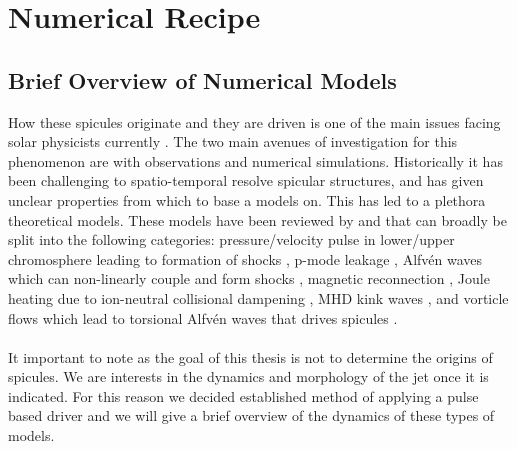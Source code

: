 \documentclass[12pt]{ociamthesis}
\newcommand{\Alfven}{Alfv\'{e}n }
\newcommand{\np}{\\ \\}
\begin{document}
\baselineskip=18pt


\chapter{Numerical Recipe}
\label{chap:Numerical_Recipe}
\section{Brief Overview of Numerical Models}
\label{sec:models}
How these spicules originate and they are driven is one of the main issues facing solar physicists currently \citep{Tsiropoula2012,kuzma2017ApJ84978K,Martinez-Sykora2017}. The two main avenues of investigation for this phenomenon are with observations and numerical simulations. Historically it has been challenging to spatio-temporal resolve spicular structures, and has given unclear properties from which to base a models on. This has led to a plethora theoretical models. These models have been reviewed by \cite{Sterling_2000SoPh} and \cite{Aschwanden2019ASSL} that can broadly be split into the following categories: pressure/velocity pulse in lower/upper chromosphere leading to formation of shocks \citep{Shibata1982,Suematsu1982SoPh7599S,Hollweg1982ApJ257345H,Sterling1990ApJ349647S,Heggland2007ApJ6661277H,kuzma2017ApJ84978K}, p-mode leakage \citep{Pontieu2004Natur},  \Alfven waves which can non-linearly couple and form shocks \citep{Hollweg1982SoPh7535H,Hollweg1992ApJ389731H, Kudoh1999ApJ514493K, Matsumoto2010ApJ7101857M}, magnetic reconnection \citep{Yokoyama1995Natur37542Y,Yokoyama1996PASJ48353Y, Archontis2005ApJ6351299A, Pontieu2007PASJ,Isobe2008ApJ679L57I,Nishizuka2008ApJ683L83N,Sterling2010ApJ,Gonz2017ApJ,Gonz2018arXiv180704224G,Gonz2018ApJ856176G}, Joule heating due to ion-neutral collisional dampening \citep{Haerendel1992Natur360241H,James2003AA}, MHD kink waves \citep{Kukhianidze2006A&A}, and vorticle flows which lead to torsional \Alfven waves that drives spicules \citep{Iijima2017ApJ,Samanta2019Sci}. \np
%
It important to note as the goal of this thesis is not to determine the origins of spicules. We are interests in the dynamics and morphology of the jet once it is indicated. For this reason we decided established method of applying a pulse based driver and we will give a brief overview of the dynamics of these types of models.   
\end{document}
